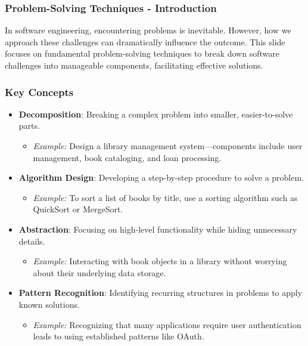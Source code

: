 \documentclass{beamer}
\begin{document}
\begin{frame}[fragile]
    \frametitle{Problem-Solving Techniques - Introduction}
    In software engineering, encountering problems is inevitable. 
    However, how we approach these challenges can dramatically influence the outcome. 
    This slide focuses on fundamental problem-solving techniques to break down software challenges into manageable components, facilitating effective solutions.
\end{frame}

\begin{frame}[fragile]
    \frametitle{Key Concepts}
    \begin{itemize}
        \item \textbf{Decomposition}: Breaking a complex problem into smaller, easier-to-solve parts.
        \begin{itemize}
            \item \textit{Example:} Design a library management system—components include user management, book cataloging, and loan processing.
        \end{itemize}
        
        \item \textbf{Algorithm Design}: Developing a step-by-step procedure to solve a problem.
        \begin{itemize}
            \item \textit{Example:} To sort a list of books by title, use a sorting algorithm such as QuickSort or MergeSort.
        \end{itemize}
        
        \item \textbf{Abstraction}: Focusing on high-level functionality while hiding unnecessary details.
        \begin{itemize}
            \item \textit{Example:} Interacting with book objects in a library without worrying about their underlying data storage.
        \end{itemize}
        
        \item \textbf{Pattern Recognition}: Identifying recurring structures in problems to apply known solutions.
        \begin{itemize}
            \item \textit{Example:} Recognizing that many applications require user authentication leads to using established patterns like OAuth.
        \end{itemize}
    \end{itemize}
\end{frame}
\end{document}
